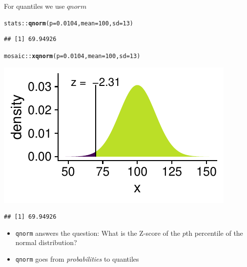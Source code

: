\documentclass[10pt,handout]{beamer}\usepackage[]{graphicx}\usepackage[]{color}
\makeatletter
\newcommand{\hlnum}[1]{\textcolor[rgb]{0.686,0.059,0.569}{#1}}%
\newcommand{\hlopt}[1]{\textcolor[rgb]{0,0,0}{#1}}%
\newcommand{\hlstd}[1]{\textcolor[rgb]{0.345,0.345,0.345}{#1}}%
\newcommand{\hlkwc}[1]{\textcolor[rgb]{0.333,0.667,0.333}{#1}}%
\newcommand{\hlkwd}[1]{\textcolor[rgb]{0.737,0.353,0.396}{\textbf{#1}}}%
\newenvironment{kframe}{%
 \def\at@end@of@kframe{}%
 \ifinner\ifhmode%
  \def\at@end@of@kframe{\end{minipage}}%
  \begin{minipage}{\columnwidth}%
 \fi\fi%
 \def\FrameCommand##1{\hskip\@totalleftmargin \hskip-\fboxsep
 \colorbox{shadecolor}{##1}\hskip-\fboxsep
     \hskip-\linewidth \hskip-\@totalleftmargin \hskip\columnwidth}%
 \MakeFramed {\advance\hsize-\width
   \@totalleftmargin\z@ \linewidth\hsize
   \@setminipage}}%
 {\par\unskip\endMakeFramed%
 \at@end@of@kframe}
\newenvironment{knitrout}{}{} %
\makeatother
\begin{document}
\begin{frame}[fragile]{For quantiles we use $qnorm$}
	
	
	
\begin{knitrout}\tiny
{}\color{fgcolor}\begin{kframe}
\begin{alltt}
\hlstd{stats}\hlopt{::}\hlkwd{qnorm}\hlstd{(}\hlkwc{p} \hlstd{=} \hlnum{0.0104}\hlstd{,} \hlkwc{mean} \hlstd{=} \hlnum{100}\hlstd{,} \hlkwc{sd} \hlstd{=} \hlnum{13}\hlstd{)}
\end{alltt}
\begin{verbatim}
## [1] 69.94926
\end{verbatim}
\end{kframe}
\end{knitrout}
	
	\pause 
	
\begin{knitrout}\tiny
{}\color{fgcolor}\begin{kframe}
\begin{alltt}
\hlstd{mosaic}\hlopt{::}\hlkwd{xqnorm}\hlstd{(}\hlkwc{p} \hlstd{=} \hlnum{0.0104}\hlstd{,} \hlkwc{mean} \hlstd{=} \hlnum{100}\hlstd{,} \hlkwc{sd} \hlstd{=} \hlnum{13}\hlstd{)}
\end{alltt}
\end{kframe}

{\centering \includegraphics[width=0.6\linewidth]{figure/probs5-1} 

}


\begin{kframe}\begin{verbatim}
## [1] 69.94926
\end{verbatim}
\end{kframe}
\end{knitrout}
	
	\pause 
	
	\small{
		\begin{itemize}
			\item \texttt{qnorm} answers the question: What is the Z-score of the $p$th percentile of the normal distribution?
			
			\item \texttt{qnorm} goes from \textit{probabilities} to quantiles 
		\end{itemize}
	}
\end{frame}
\end{document}
